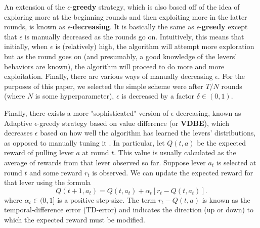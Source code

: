 \documentclass[12pt]{article}
\begin{document}
An extension of the $\epsilon$-\textbf{greedy} strategy, which is also based off of the idea of exploring more at the beginning rounds and then exploiting more in the latter rounds, is known as $\epsilon$-\textbf{decreasing}. It is basically the same as $\epsilon$-\textbf{greedy} except that $\epsilon$ is manually decreased as the rounds go on. Intuitively, this means that initially, when $\epsilon$ is (relatively) high, the algorithm will attempt more exploration but as the round goes on (and presumably, a good knowledge of the levers' behaviors are known), the algorithm will proceed to do more and more exploitation. Finally, there are various ways of manually decreasing $\epsilon$. For the purposes of this paper, we selected the simple scheme were after $T/N$ rounds (where $N$ is some hyperparameter), $\epsilon$ is decreased by a factor $\delta \in (0,1)$.

Finally, there exists a more "sophisticated" version of $\epsilon$-decreasing, known as Adaptive $\epsilon$-greedy strategy based on value difference (or \textbf{VDBE}), which decreases $\epsilon$ based on how well the algorithm has learned the levers' distributions, as opposed to manually tuning it \cite{Tokic:2010:A9E:1882150.1882177}. In particular, let $Q(t, a)$ be the expected reward of pulling lever $a$ at round $t$. This value is usually calculated as the average of rewards from that lever observed so far. Suppose lever $a_t$ is selected at round $t$ and some reward $r_t$ is observed. We can update the expected reward for that lever using the formula
\begin{equation*}
    Q(t+1, a_t) = Q(t,a_t) + \alpha_t [r_{t} - Q(t, a_t)].
\end{equation*}
where $\alpha_t \in (0, 1]$ is a positive step-size. The term $r_{t} - Q(t, a)$ is known as the temporal-difference error (TD-error) and indicates the direction (up or down) to which the expected reward must be modified.
\end{document}
